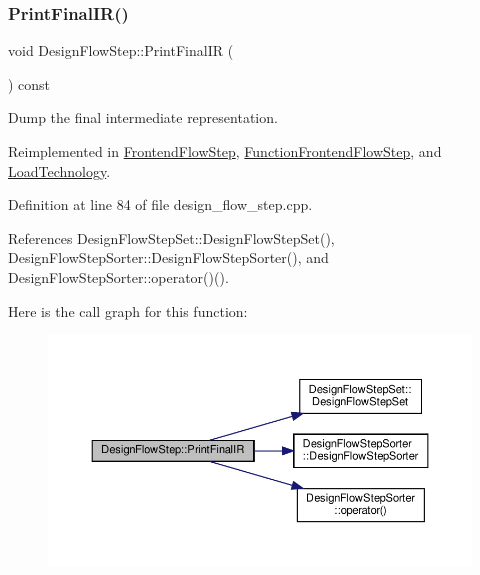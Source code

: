 \mbox{\label{classDesignFlowStep_a1d30b6b575c459521803a388a2085d60}} 
\subsubsection{\texorpdfstring{Print\+Final\+I\+R()}{PrintFinalIR()}}
{\footnotesize\ttfamily void Design\+Flow\+Step\+::\+Print\+Final\+IR (\begin{DoxyParamCaption}{ }\end{DoxyParamCaption}) const\hspace{0.3cm}{\ttfamily [virtual]}}



Dump the final intermediate representation. 



Reimplemented in \hyperlink{classFrontendFlowStep_a2a9b475fe6e3739803cb4e6afdc94a01}{Frontend\+Flow\+Step}, \hyperlink{classFunctionFrontendFlowStep_abe2dc98fddb94bebf12a91e8c78f9dcc}{Function\+Frontend\+Flow\+Step}, and \hyperlink{classLoadTechnology_a4f0526d4eb5b2a5be97a670e9ad580e2}{Load\+Technology}.



Definition at line 84 of file design\+\_\+flow\+\_\+step.\+cpp.



References Design\+Flow\+Step\+Set\+::\+Design\+Flow\+Step\+Set(), Design\+Flow\+Step\+Sorter\+::\+Design\+Flow\+Step\+Sorter(), and Design\+Flow\+Step\+Sorter\+::operator()().

Here is the call graph for this function\+:
\nopagebreak
\begin{figure}[H]
\begin{center}
\leavevmode
\includegraphics[width=350pt]{d3/da9/classDesignFlowStep_a1d30b6b575c459521803a388a2085d60_cgraph}
\end{center}
\end{figure}
\mbox{\label{classDesignFlowStep_a2a169bd0ac5fe3cd5179871714cbe1ab}} 

